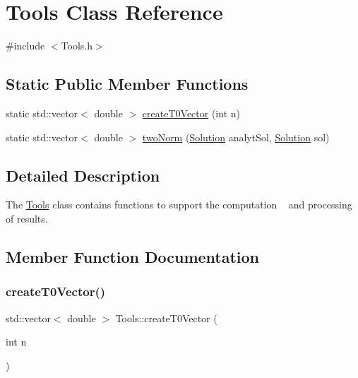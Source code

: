 \hypertarget{class_tools}{}\section{Tools Class Reference}
\label{class_tools}


{\ttfamily \#include $<$Tools.\+h$>$}

\subsection*{Static Public Member Functions}
\begin{DoxyCompactItemize}
\item 
static std\+::vector$<$ double $>$ \hyperlink{class_tools_a7e58e60636cab3c3454f16cb861792b3}{create\+T0\+Vector} (int n)
\item 
static std\+::vector$<$ double $>$ \hyperlink{class_tools_a5ba9a57b8d07dbca30577f3a5cd6d98f}{two\+Norm} (\hyperlink{class_solution}{Solution} analyt\+Sol, \hyperlink{class_solution}{Solution} sol)
\end{DoxyCompactItemize}


\subsection{Detailed Description}
The \hyperlink{class_tools}{Tools} class contains functions to support the computation ~\newline
 and processing of results. 

\subsection{Member Function Documentation}
\mbox{\label{class_tools_a7e58e60636cab3c3454f16cb861792b3}} 
\subsubsection{\texorpdfstring{create\+T0\+Vector()}{createT0Vector()}}
{\footnotesize\ttfamily std\+::vector$<$ double $>$ Tools\+::create\+T0\+Vector (\begin{DoxyParamCaption}\item[{int}]{n }\end{DoxyParamCaption})\hspace{0.3cm}{\ttfamily [static]}}

